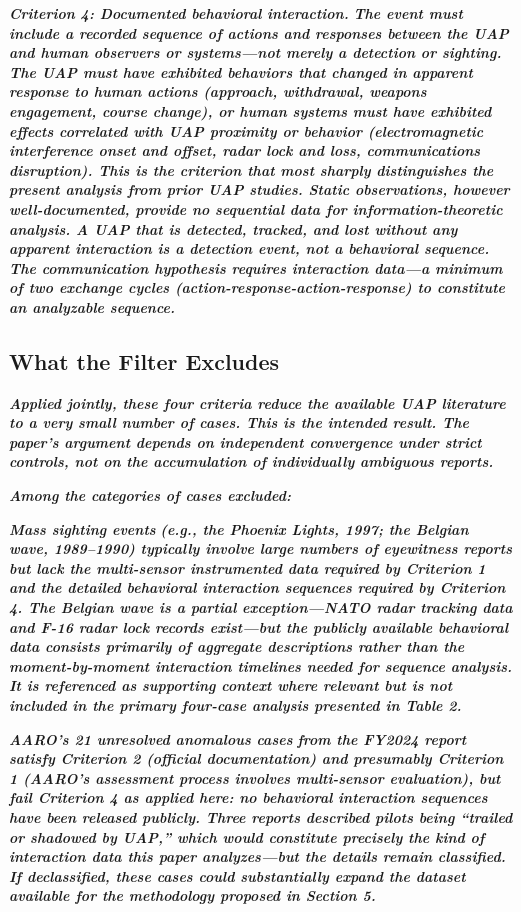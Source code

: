 \documentclass[11pt,letterpaper]{article}
\begin{document}
\textbf{\textit{Criterion 4: Documented behavioral interaction.}}\textbf{\textit{ The event must include a recorded sequence of actions and responses between the UAP and human observers or systems---not merely a detection or sighting. The UAP must have exhibited behaviors that changed in apparent response to human actions (approach, withdrawal, weapons engagement, course change), or human systems must have exhibited effects correlated with UAP proximity or behavior (electromagnetic interference onset and offset, radar lock and loss, communications disruption). This is the criterion that most sharply distinguishes the present analysis from prior UAP studies. Static observations, however well-documented, provide no sequential data for information-theoretic analysis. A UAP that is detected, tracked, and lost without any apparent interaction is a detection event, not a behavioral sequence. The communication hypothesis requires interaction data---a minimum of two exchange cycles (action-response-action-response) to constitute an analyzable sequence.}}


\subsection{What the Filter Excludes}

\textbf{\textit{Applied jointly, these four criteria reduce the available UAP literature to a very small number of cases. This is the intended result. The paper's argument depends on independent convergence under strict controls, not on the accumulation of individually ambiguous reports.}}


\textbf{\textit{Among the categories of cases excluded:}}


\textbf{\textit{Mass sighting events}}\textbf{\textit{ (e.g., the Phoenix Lights, 1997; the Belgian wave, 1989--1990) typically involve large numbers of eyewitness reports but lack the multi-sensor instrumented data required by Criterion 1 and the detailed behavioral interaction sequences required by Criterion 4. The Belgian wave is a partial exception---NATO radar tracking data and F-16 radar lock records exist---but the publicly available behavioral data consists primarily of aggregate descriptions rather than the moment-by-moment interaction timelines needed for sequence analysis. It is referenced as supporting context where relevant but is not included in the primary four-case analysis presented in Table 2.}}


\textbf{\textit{AARO's 21 unresolved anomalous cases}}\textbf{\textit{ from the FY2024 report satisfy Criterion 2 (official documentation) and presumably Criterion 1 (AARO's assessment process involves multi-sensor evaluation), but fail Criterion 4 as applied here: no behavioral interaction sequences have been released publicly. Three reports described pilots being ``trailed or shadowed by UAP,'' which would constitute precisely the kind of interaction data this paper analyzes---but the details remain classified. If declassified, these cases could substantially expand the dataset available for the methodology proposed in Section 5.}}
\end{document}
